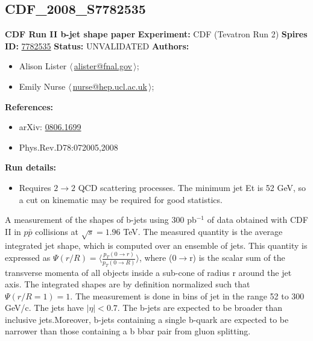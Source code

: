 \clearpage


\clearpage

\subsection[CDF\_2008\_S7782535]{CDF\_2008\_S7782535\,\cite{Aaltonen:2008de}}
\textbf{CDF Run II b-jet shape paper}\newline
\textbf{Experiment:} CDF (Tevatron Run 2) \newline
\textbf{Spires ID:} \href{http://www.slac.stanford.edu/spires/find/hep/www?rawcmd=key+7782535}{7782535}\newline
\textbf{Status:} UNVALIDATED\newline
\textbf{Authors:}
\begin{itemize}
  \item Alison Lister $\langle\,$\href{mailto:alister@fnal.gov}{alister@fnal.gov}$\,\rangle$;
  \item Emily Nurse $\langle\,$\href{mailto:nurse@hep.ucl.ac.uk}{nurse@hep.ucl.ac.uk}$\,\rangle$;
\end{itemize}
\textbf{References:}
\begin{itemize}
  \item arXiv: \href{http://arxiv.org/abs/0806.1699}{0806.1699}
  \item Phys.Rev.D78:072005,2008
\end{itemize}
\textbf{Run details:}
\begin{itemize}

  \item Requires  $2\rightarrow{2}$ QCD scattering processes. The minimum jet Et is 52 GeV, so a cut on kinematic \pTmin may be required for good statistics.\end{itemize}

\noindent A measurement of the shapes of b-jets using 300 pb$^{-1}$ of data obtained with CDF II in $p\bar{p}$ collisions at $\sqrt{s}=1.96$ TeV. The measured quantity is the average integrated jet shape, which is computed over an ensemble of jets. This quantity is expressed as $\Psi(r/R) = \langle\frac{p_T(0 \rightarrow r)}{p_T(0 \rightarrow R)}\rangle$, where \pT (0$\rightarrow$r) is the scalar sum of the transverse momenta of all objects inside a sub-cone of radius r around the jet axis. The integrated shapes are by definition normalized such that  $\Psi(r/R =1) = 1$.   The measurement is done in bins of jet \pT in the range 52 to 300 GeV/c. The jets have $|\eta| < 0.7$. The b-jets are expected to be broader than inclusive jets.Moreover, b-jets containing a single b-quark are expected to be narrower than those containing a b bbar pair from gluon splitting.

